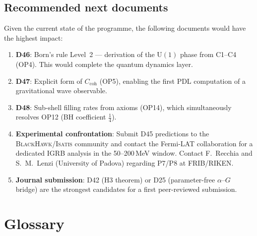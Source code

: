\documentclass[11pt,a4paper]{article}
\theoremstyle{plain}
\theoremstyle{definition}
\theoremstyle{remark}
\begin{document}
\subsection{Recommended next documents}
\label{subsec:nextdocs}
Given the current state of the programme, the following documents would have the highest impact:

\begin{enumerate}
\item \textbf{D46}: Born's rule Level~2 --- derivation of the $\mathrm{U}(1)$ phase from C1--C4 (OP4). This would complete the quantum dynamics layer.
\item \textbf{D47}: Explicit form of $C_{\mathrm{coh}}$ (OP5), enabling the first PDL computation of a gravitational wave observable.
\item \textbf{D48}: Sub-shell filling rates from axioms (OP14), which simultaneously resolves OP12 (BH coefficient $\tfrac{1}{4}$).
\item \textbf{Experimental confrontation}: Submit D45 predictions to the \textsc{BlackHawk}/\textsc{Isatis} community and contact the Fermi-LAT collaboration for a dedicated IGRB analysis in the 50--200\,MeV window. Contact F.\ Recchia and S.\ M.\ Lenzi (University of Padova) regarding P7/P8 at FRIB/RIKEN.
\item \textbf{Journal submission}: D42 (H3 theorem) or D25 (parameter-free $\alpha$--$G$ bridge) are the strongest candidates for a first peer-reviewed submission.
\end{enumerate}

\section{Glossary}
\label{sec:glossary}
\end{document}

